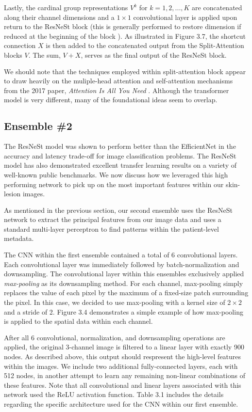 \documentclass [MAS] {uclathes}
\begin{document}
Lastly, the cardinal group representations $V^k$ for $k=1, 2, ..., K$ are concatenated along their channel dimensions and a $1 \times 1$ convolutional layer is applied upon return to the ResNeSt block (this is generally performed to restore dimension if reduced at the beginning of the block \cite{resnet}). As illustrated in Figure 3.7, the shortcut connection $X$ is then added to the concatenated output from the Split-Attention blocks $V$. The sum, $V+X$, serves as the final output of the ResNeSt block.

We should note that the techniques employed within split-attention block appear to draw heavily on the muliple-head attention and self-attention mechanisms from the 2017 paper, \textit{Attention Is All You Need} \cite{attention}. Although the transformer model is very different, many of the foundational ideas seem to overlap.

\subsection{Ensemble \#2}

The ResNeSt model was shown to perform better than the EfficientNet in the accuracy and latency trade-off for image classification problems. The ResNeSt model has also demonstrated excellent transfer learning results on a variety of well-known public benchmarks. We now discuss how we leveraged this high performing network to pick up on the most important features within our skin-lesion images.

As mentioned in the previous section, our second ensemble uses the ResNeSt network to extract the principal features from our image data and uses a standard multi-layer perceptron to find patterns within the patient-level metadata. 
 
The CNN within the first ensemble contained a total of 6 convolutional layers. Each convolutional layer was immediately followed by batch-normalization and downsampling. The convolutional layer within this ensembles exclusively applied \textit{max-pooling} as its downsampling method. For each channel, max-pooling simply replaces the value of each pixel by the maximum of a fixed-size patch surrounding the pixel. In this case, we decided to use max-pooling with a kernel size of $2 \times 2$ and a stride of 2. Figure 3.4 demonstrates a simple example of how max-pooling is applied to the spatial data within each channel. 

After all 6 convolutional, normalization, and downsampling operations are applied, the original 3-channel image is filtered to a linear layer with exactly 900 nodes. As described above, this output should respresent the high-level features within the images. We include two additional fully-connected layers, each with 512 nodes, in another attempt to learn any remaining non-linear combinations of these features. Note that all convolutional and linear layers associated with this network used the ReLU activation function. Table 3.1 includes the details regarding the specific architecture used for the CNN within our first ensemble.
\end{document}
